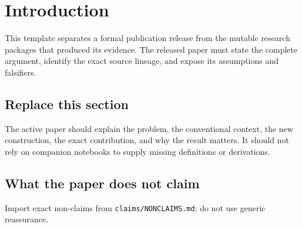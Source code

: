 \section{Introduction}

This template separates a formal publication release from the mutable research packages that produced its evidence. The released paper must state the complete argument, identify the exact source lineage, and expose its assumptions and falsifiers.

\subsection*{Replace this section}

The active paper should explain the problem, the conventional context, the new construction, the exact contribution, and why the result matters. It should not rely on companion notebooks to supply missing definitions or derivations.

\subsection*{What the paper does not claim}

Import exact non-claims from \texttt{claims/NONCLAIMS.md}; do not use generic reassurance.
